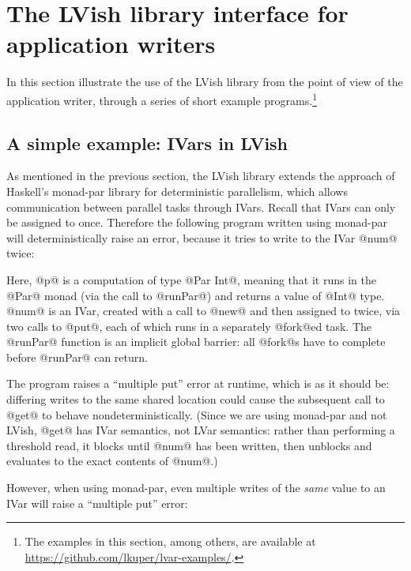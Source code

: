 \section{The LVish library interface for application writers}\label{s:lvish-api}

In this section  illustrate the use of the LVish library
from the point of view of the application writer, through a series of
short example programs.\footnote{The examples in this section, among
  others, are available at
  \url{https://github.com/lkuper/lvar-examples/}.}

\subsection{A simple example: IVars in LVish}

\ifdefined\DISSERTATION
As mentioned in the previous section, the LVish library extends the
approach of Haskell's monad-par library for deterministic parallelism,
which allows communication between parallel tasks through IVars.
Recall that IVars can only be assigned to once.  Therefore the
following program written using monad-par will deterministically raise an
error, because it tries to write to the IVar @num@ twice:

\singlespacing

\doublespacing

Here, @p@ is a computation of type @Par Int@, meaning that it runs in
the @Par@ monad (via the call to @runPar@) and returns a value of
@Int@ type.  @num@ is an IVar, created with a call to @new@ and then
assigned to twice, via two calls to @put@, each of which runs in a separately
@fork@ed task.  The @runPar@ function is an implicit global barrier:
all @fork@s have to complete before @runPar@ can return.

The program raises a ``multiple put'' error at runtime, which is as it
should be: differing writes to the same shared location could cause
the subsequent call to @get@ to behave nondeterministically.  (Since
we are using monad-par and not LVish, @get@ has IVar semantics, not
LVar semantics: rather than performing a threshold read, it blocks
until @num@ has been written, then unblocks and evaluates to the exact
contents of @num@.)

However, when using monad-par, even multiple writes of the \emph{same}
value to an IVar will raise a ``multiple put'' error:

\singlespacing

\doublespacing

